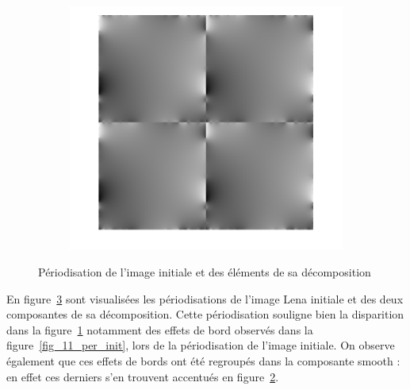 \documentclass[12pt,a4paper,onecolumn]{article}
\begin{document}
\begin{figure}[H]
\begin{subfigure}[b]{0.4\textwidth}
		\label{fig_11_per_per}
	\end{subfigure}
	\begin{subfigure}[b]{0.4\textwidth}
		\centering
		\includegraphics[height = 0.25\textheight]{per_smooth}
		\label{fig_11_per_smooth}
	\end{subfigure}
	\caption{Périodisation de l'image initiale et des éléments de sa décomposition}
	\label{fig_11_periodisation}
\end{figure}

En figure~\ref{fig_11_periodisation} sont visualisées les périodisations de l'image Lena initiale et des deux composantes de sa décomposition. Cette périodisation souligne bien la disparition dans la figure~\ref{fig_11_per_per} notamment des effets de bord observés dans la figure~\ref{fig_11_per_init}, lors de la périodisation de l'image initiale. On observe également que ces effets de bords ont été regroupés dans la composante smooth : en effet ces derniers s'en trouvent accentués en figure~\ref{fig_11_per_smooth}.
\end{document}
